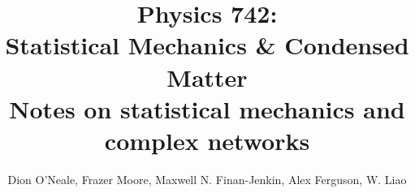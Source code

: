 \documentclass{article}
\begin{document}
\newcommand{\calG}{\mathcal{G}}
\title{Physics 742: \\
	Statistical Mechanics \& Condensed Matter\\
	Notes on statistical mechanics and complex networks}
\author{Dion O'Neale, Frazer Moore, Maxwell N. Finan-Jenkin, Alex Ferguson, W. Liao}
\maketitle
\newpage
\tableofcontents
\newpage










\end{document}
